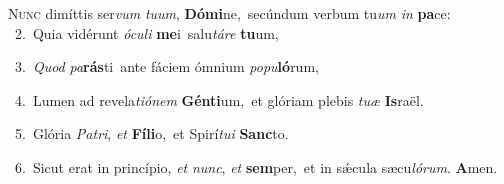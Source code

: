 \lettrine{\initial\textcolor{\initialcolor}{N}}{unc} dimíttis ser\textit{vum} \textit{tu}\-\textit{um}, \textbf{Dó}\-\textbf{mi}ne,~\star secúndum verbum tu\textit{um} \textit{in} \textbf{pa}\-ce:\\
{\numbfont\textcolor{\numbcolor}{~2.}}~Quia vidérunt \textit{ó}\-\textit{cu}\textit{li} \textbf{me}\-i~\star salu\-\textit{tá}\-\textit{re} \textbf{tu}\-um,\par
{\numbfont\textcolor{\numbcolor}{~3.}}~\textit{Quod} \textit{pa}\-\textbf{rás}ti~\star ante fáciem ómnium \textit{po}\-\textit{pu}\textbf{ló}rum,\par
{\numbfont\textcolor{\numbcolor}{~4.}}~Lumen ad revela\-\textit{ti}\-\textit{ó}\textit{nem} \textbf{Gén}\-\textbf{ti}um,~\star et glóriam plebis \textit{tu}\-\textit{æ} \textbf{Is}\-raël.\par
{\numbfont\textcolor{\numbcolor}{~5.}}~Glória \textit{Pa}\-\textit{tri}, \textit{et} \textbf{Fí}\-\textbf{li}o,~\star et Spirí\-\textit{tu}\-\textit{i} \textbf{Sanc}\-to.\par
{\numbfont\textcolor{\numbcolor}{~6.}}~Sicut erat in princípio, \textit{et} \textit{nunc}\-, \textit{et} \textbf{sem}\-per,~\star et in sǽcula sæcu\-\textit{ló}\-\textit{rum}. \textbf{A}\-men.\par
